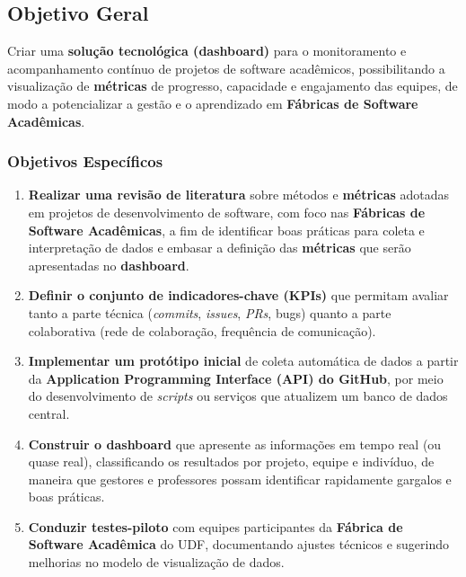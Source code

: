 \documentclass[
	12pt,           %
	openright,      %
	oneside,        %
	a4paper,        %
	brazil          %
]{abntex2}
\begin{document}
\subsection{Objetivo Geral}
Criar uma \textbf{solução tecnológica (dashboard)} para o monitoramento e acompanhamento contínuo de projetos de software acadêmicos, possibilitando a visualização de \textbf{métricas} de progresso, capacidade e engajamento das equipes, de modo a potencializar a gestão e o aprendizado em \textbf{Fábricas de Software Acadêmicas}.

\subsubsection{Objetivos Específicos}
\label{sec:objetivos-especificos}
\begin{enumerate}
    \item \textbf{Realizar uma revisão de literatura}\label{OE1} sobre métodos e \textbf{métricas} adotadas em projetos de desenvolvimento de software, com foco nas \textbf{Fábricas de Software Acadêmicas}, a fim de identificar boas práticas para coleta e interpretação de dados e embasar a definição das \textbf{métricas} que serão apresentadas no \textbf{dashboard}.
    \item \textbf{Definir o conjunto de indicadores-chave (KPIs)}\label{OE2} que permitam avaliar tanto a parte técnica (\emph{commits}, \emph{issues}, \emph{PRs}, bugs) quanto a parte colaborativa (rede de colaboração, frequência de comunicação).
    \item \textbf{Implementar um protótipo inicial}\label{OE3} de coleta automática de dados a partir da \textbf{Application Programming Interface (API) do GitHub}, por meio do desenvolvimento de \emph{scripts} ou serviços que atualizem um banco de dados central.
    \item \textbf{Construir o dashboard}\label{OE4} que apresente as informações em tempo real (ou quase real), classificando os resultados por projeto, equipe e indivíduo, de maneira que gestores e professores possam identificar rapidamente gargalos e boas práticas.
    \item \textbf{Conduzir testes-piloto}\label{OE5} com equipes participantes da \textbf{Fábrica de Software Acadêmica} do UDF, documentando ajustes técnicos e sugerindo melhorias no modelo de visualização de dados.
\end{enumerate}
\end{document}

